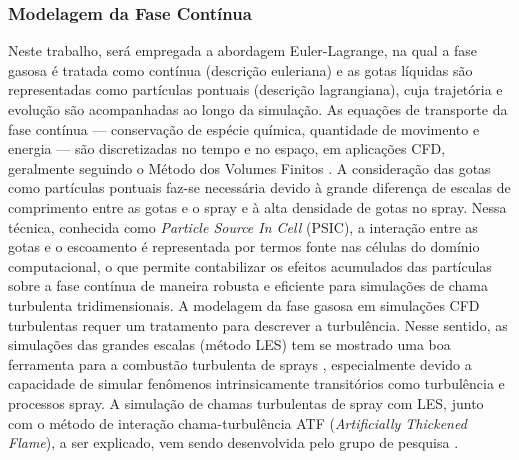 \subsubsection{Modelagem da Fase Contínua} \label{sec:gas}

Neste trabalho, será empregada a abordagem Euler-Lagrange, na qual a fase gasosa é tratada como contínua (descrição euleriana) e as gotas líquidas são representadas como partículas pontuais (descrição lagrangiana), cuja trajetória e evolução são acompanhadas ao longo da simulação. 
As equações de transporte da fase contínua — conservação de espécie química, quantidade de movimento e energia — são discretizadas no tempo e no espaço, em aplicações CFD, geralmente seguindo o Método dos Volumes Finitos \cite{Anderson2009}.
A consideração das gotas como partículas pontuais faz-se necessária devido à grande diferença de escalas de comprimento entre as gotas e o spray e à alta densidade de gotas no spray.
Nessa técnica, conhecida como \emph{Particle Source In Cell} (PSIC), a interação entre as gotas e o escoamento é representada por termos fonte nas células do domínio computacional, o que permite contabilizar os efeitos acumulados das partículas sobre a fase contínua de maneira robusta e eficiente para simulações de chama turbulenta tridimensionais.
A modelagem da fase gasosa em simulações CFD turbulentas requer um tratamento para descrever a turbulência. 
Nesse sentido, as simulações das grandes escalas (método LES) tem se mostrado uma boa ferramenta para a combustão turbulenta de sprays \cite{SacomanoF2020CF}, especialmente devido a capacidade de simular fenômenos intrinsicamente transitórios como turbulência e processos spray.
A simulação de chamas turbulentas de spray com LES, junto com o método de interação chama-turbulência ATF (\emph{Artificially Thickened Flame}), a ser explicado, vem sendo desenvolvida pelo grupo de pesquisa \cite{SacomanoF2017PhD,SacomanoF2019Fluids,SacomanoF2017CF,SacomanoF2020CF,SacomanoF2018CTM}.

